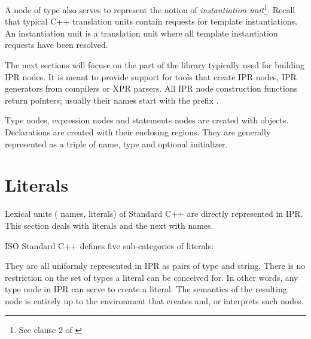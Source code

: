\documentclass[a4paper,12pt]{article}
\begin{document}
A node of type  also serves to represent the notion of 
\emph{instantiation unit}\footnote{See clause 2 of \cite{iso98, iso03}}.
Recall that typical C++ translation units contain requests for template
instantiations.  An instantiation unit is a translation unit where all
template instantiation requests have been resolved.


The next sections will focuse on the part of the library typically used for
building IPR nodes.  It is meant to provide support for tools that create IPR
nodes, \eg{} IPR generators from compilers or XPR parsers.  All IPR
node construction functions return pointers; usually their names start with
the prefix .  

Type nodes, expression nodes and statements nodes are created with
 objects.  Declarations are created with their enclosing
regions.  They are generally represented as a triple of name, type and
optional initializer.


\section{Literals}
\label{sec:literals}

Lexical units (\eg{} names, literals) of Standard C++ are directly represented
in IPR. This section deals with literals and the next with names.

ISO Standard C++ defines five sub-categories of literals:
\begin{Grammar}
\end{Grammar}
They are all uniformly represented in IPR as pairs of type and string.
There is no restriction on the set of types a literal can be conceived for.
In other words, any type node in IPR can serve to create a literal.  The
semantics of the resulting node is entirely up to the environment that creates
and, or interprets such nodes. 

\end{document}
